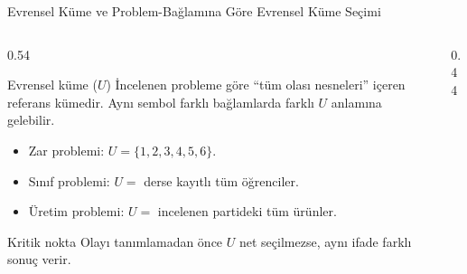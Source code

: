 \documentclass[light]{lutbeamer}
\begin{document}
\begin{frame}{Evrensel Küme ve Problem-Bağlamına Göre Evrensel Küme Seçimi}
    \small
    \begin{columns}[T]
        \begin{column}{0.54\textwidth}
            \begin{block}{Evrensel küme ($U$)}
                İncelenen probleme göre ``tüm olası nesneleri'' içeren referans kümedir.
                Aynı sembol farklı bağlamlarda farklı $U$ anlamına gelebilir.
            \end{block}

            \begin{itemize}
                \item Zar problemi: $U=\{1,2,3,4,5,6\}$.
                \item Sınıf problemi: $U=$ derse kayıtlı tüm öğrenciler.
                \item Üretim problemi: $U=$ incelenen partideki tüm ürünler.
            \end{itemize}

            \begin{alertblock}{Kritik nokta}
                Olayı tanımlamadan önce $U$ net seçilmezse, aynı ifade farklı sonuç verir.
            \end{alertblock}
        \end{column}
        \begin{column}{0.44\textwidth}
            \centering
        \end{column}
    \end{columns}

\end{frame}
\end{document}
